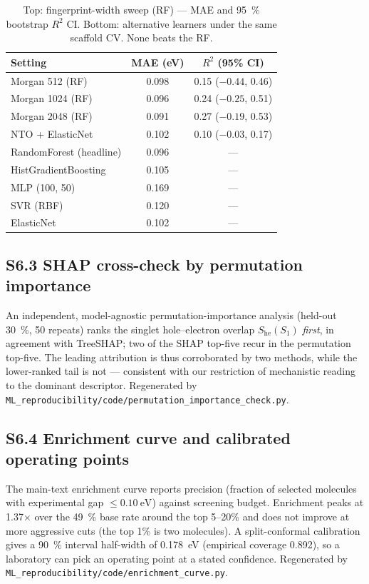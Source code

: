 \documentclass[twoside,twocolumn,9pt]{extarticle}
\begin{document}
\begin{table}[htbp]
  \centering
  \caption{Top: fingerprint-width sweep (RF) — MAE and \qty{95}{\percent} bootstrap $R^2$
    CI. Bottom: alternative learners under the same scaffold CV. None beats the RF.}
  \label{tab:capacity}
  \footnotesize
  \begin{tabular}{lcc}
    \toprule
    Setting & MAE (eV) & $R^2$ (95\% CI) \\
    \midrule
    Morgan 512 (RF)   & 0.098 & 0.15 ($-0.44$, 0.46) \\
    Morgan 1024 (RF)  & 0.096 & 0.24 ($-0.25$, 0.51) \\
    Morgan 2048 (RF)  & 0.091 & 0.27 ($-0.19$, 0.53) \\
    NTO + ElasticNet  & 0.102 & 0.10 ($-0.03$, 0.17) \\
    \midrule
    RandomForest (headline) & 0.096 & --- \\
    HistGradientBoosting    & 0.105 & --- \\
    MLP (100, 50)           & 0.169 & --- \\
    SVR (RBF)               & 0.120 & --- \\
    ElasticNet              & 0.102 & --- \\
    \bottomrule
  \end{tabular}
\end{table}

\subsection*{S6.3 SHAP cross-check by permutation importance}
An independent, model-agnostic permutation-importance analysis (held-out \qty{30}{\percent},
\num{50} repeats) ranks the singlet hole--electron overlap $S_\text{he}(S_1)$ \emph{first},
in agreement with TreeSHAP; two of the SHAP top-five recur in the permutation top-five. The
leading attribution is thus corroborated by two methods, while the lower-ranked tail is not
--- consistent with our restriction of mechanistic reading to the dominant descriptor.
Regenerated by \texttt{ML\_reproducibility/code/permutation\_importance\_check.py}.

\subsection*{S6.4 Enrichment curve and calibrated operating points}
The main-text enrichment curve reports precision (fraction of selected molecules with experimental
gap $\le\qty{0.10}{\electronvolt}$) against screening budget. Enrichment peaks at
\num{1.37}$\times$ over the \qty{49}{\percent} base rate around the top \num{5}--\num{20}\%
and does not improve at more aggressive cuts (the top \num{1}\% is two molecules). A
split-conformal calibration gives a \qty{90}{\percent} interval half-width of
\qty{0.178}{\electronvolt} (empirical coverage \num{0.892}), so a laboratory can pick an
operating point at a stated confidence. Regenerated by \texttt{ML\_reproducibility/code/enrichment\_curve.py}.
\end{document}
